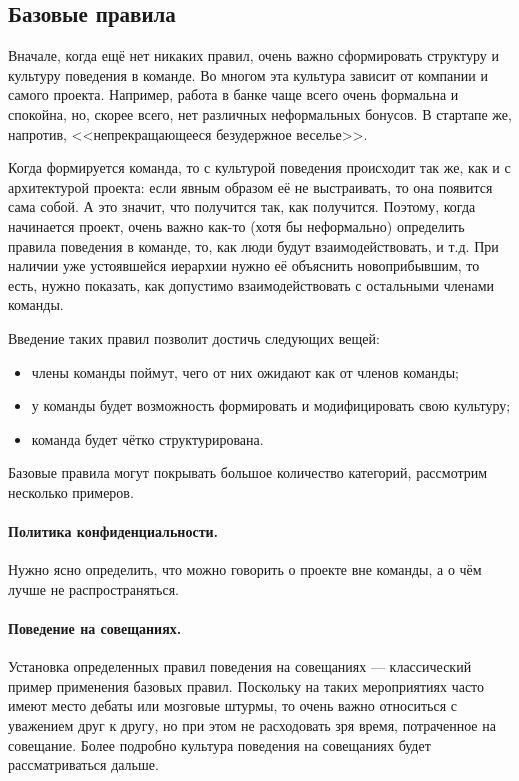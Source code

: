 \documentclass{../../text-style}
\begin{document}
\subsection{Базовые правила}

Вначале, когда ещё нет никаких правил, очень важно сформировать структуру и культуру поведения в команде. Во многом эта культура зависит от компании и самого проекта. Например, работа в банке чаще всего очень формальна и спокойна, но, скорее всего, нет различных неформальных бонусов. В стартапе же, напротив, <<непрекращающееся безудержное веселье>>. 

Когда формируется команда, то с культурой поведения происходит так же, как и с архитектурой проекта: если явным образом её не выстраивать, то она появится сама собой. А это значит, что получится так, как получится. Поэтому, когда начинается проект, очень важно как-то (хотя бы неформально) определить правила поведения в команде, то, как люди будут взаимодействовать, и т.д. При наличии уже устоявшейся иерархии нужно её объяснить новоприбывшим, то есть, нужно показать, как допустимо взаимодействовать с остальными членами команды.

Введение таких правил позволит достичь следующих вещей:

\begin{itemize}
    \item члены команды поймут, чего от них ожидают как от членов команды;
    \item у команды будет возможность формировать и модифицировать свою культуру;
    \item команда будет чётко структурирована.
\end{itemize}

Базовые правила могут покрывать большое количество категорий, рассмотрим несколько примеров.

\paragraph*{Политика конфиденциальности.} Нужно ясно определить, что можно говорить о проекте вне команды, а о чём лучше не распространяться.

\paragraph*{Поведение на совещаниях.} Установка определенных правил поведения на совещаниях --- классический пример применения базовых правил. Поскольку на таких мероприятиях часто имеют место дебаты или мозговые штурмы, то очень важно относиться с уважением друг к другу, но при этом не расходовать зря время, потраченное на совещание. Более подробно культура поведения на совещаниях будет рассматриваться дальше.
\end{document}
